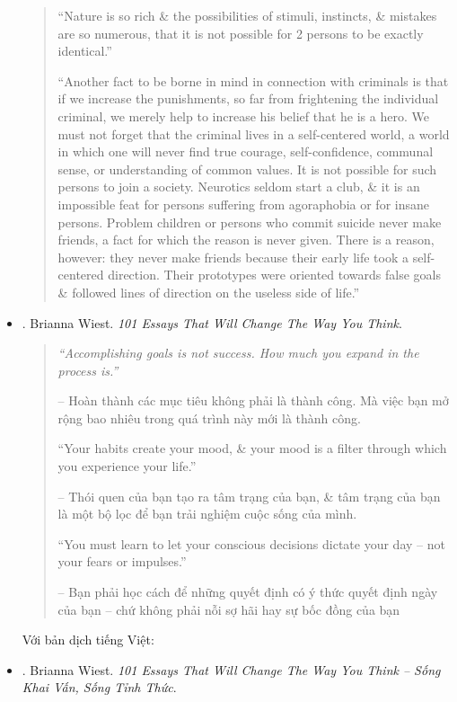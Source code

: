 \documentclass[12pt]{article}
\begin{document}
\begin{itemize}
\begin{quotation}
		``Nature is so rich \& the possibilities of stimuli, instincts, \& mistakes are so numerous, that it is not possible for 2 persons to be exactly identical.''
		
		``Another fact to be borne in mind in connection with criminals is that if we increase the punishments, so far from frightening the individual criminal, we merely help to increase his belief that he is a hero. We must not forget that the criminal lives in a self-centered world, a world in which one will never find true courage, self-confidence, communal sense, or understanding of common values. It is not possible for such persons to join a society. Neurotics seldom start a club, \& it is an impossible feat for persons suffering from agoraphobia or for insane persons. Problem children or persons who commit suicide never make friends, a fact for which the reason is never given. There is a reason, however: they never make friends because their early life took a self-centered direction. Their prototypes were oriented towards false goals \& followed lines of direction on the useless side of life.''
	\end{quotation}
	\item \cite{Wiest_101_essays}. {\sc Brianna Wiest}. {\it 101 Essays That Will Change The Way You Think}.
	\begin{quotation}\it
		``Accomplishing goals is not success. How much you expand in the process is.''
		
		-- Hoàn thành các mục tiêu không phải là thành công. Mà việc bạn mở rộng bao nhiêu trong quá trình này mới là thành công.
		
		``Your habits create your mood, \& your mood is a filter through which you experience your life.''
		
		-- Thói quen của bạn tạo ra tâm trạng của bạn, \& tâm trạng của bạn là một bộ lọc để bạn trải nghiệm cuộc sống của mình.
		
		``You must learn to let your conscious decisions dictate your day -- not your fears or impulses.''
		
		-- Bạn phải học cách để những quyết định có ý thức quyết định ngày của bạn -- chứ không phải nỗi sợ hãi hay sự bốc đồng của bạn
	\end{quotation}	
	Với bản dịch tiếng Việt:
	\item \cite{Wiest_101_essays_VN}. {\sc Brianna Wiest}. {\it 101 Essays That Will Change The Way You Think -- Sống Khai Vấn, Sống Tỉnh Thức}.
\end{itemize}
\end{document}

